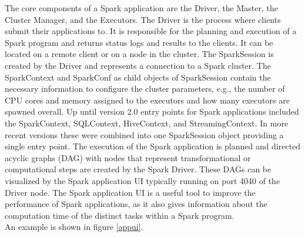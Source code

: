\noindent The core components of a Spark application are the Driver, the Master, the Cluster Manager, and the Executors. The Driver is the process where clients submit their applications to. It is responsible for the planning and execution of a Spark program and returns status logs and results to the clients. It can be located on a remote client or on a node in the cluster. The SparkSession is created by the Driver and represents a connection to a Spark cluster. The SparkContext and SparkConf as child objects of SparkSession contain the necessary information to configure the cluster parameters, e.g., the number of CPU cores and memory assigned to the executors and how many executors are spawned overall. Up until version 2.0 entry points for Spark applications included the SparkContext, SQLContext, HiveContext, and StreamingContext. In more recent versions these were combined into one SparkSession object providing a single entry point.
The execution of the Spark application is planned and directed acyclic graphs (DAG) with nodes that represent transformational or computational steps are created by the Spark Driver. These DAGs can be visualized by the Spark application UI typically running on port 4040 of the Driver node. The Spark application UI is a useful tool to improve the performance of Spark applications, as it also gives information about the computation time of the distinct tasks within a Spark program. \cite[pp. 45 ff]{sparkbook1}\\
An example is shown in figure \ref{appui}.\\

